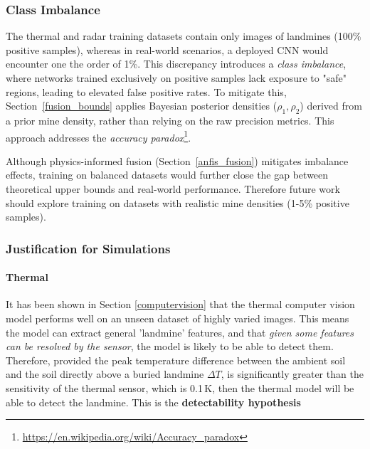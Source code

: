     \subsubsection{Class Imbalance} \label{class_imbalance}

        \noindent The thermal and radar training datasets contain only images of landmines (100\% positive samples), whereas in real-world scenarios, a deployed CNN would encounter one the order of 1\%. This discrepancy introduces a \textit{class imbalance}, where networks trained exclusively on positive samples lack exposure to "safe" regions, leading to elevated false positive rates. To mitigate this, Section~\ref{fusion_bounds} applies Bayesian posterior densities (\(\rho_1, \rho_2\)) derived from a prior mine density, rather than relying on the raw precision metrics. This approach addresses the \textit{accuracy paradox}\footnote{\url{https://en.wikipedia.org/wiki/Accuracy_paradox}}.

        \noindent Although physics-informed fusion (Section~\ref{anfis_fusion}) mitigates imbalance effects, training on balanced datasets would further close the gap between theoretical upper bounds and real-world performance. Therefore future work should explore training on datasets with realistic mine densities (1-5\% positive samples).

        
    \subsubsection{Justification for Simulations} \label{simulation_justification}
    
    
        \paragraph{Thermal} 
        
            
           It has been shown in Section \ref{computervision} that the thermal computer vision model performs well on an unseen dataset of highly varied images. This means the model can extract general 'landmine' features, and that \textit{given some features can be resolved by the sensor}, the model is likely to be able to detect them. Therefore, provided the peak temperature difference between the ambient soil and the soil directly above a buried landmine \(\Delta T\), is significantly greater than the sensitivity of the thermal sensor, which is 0.1\,K, then the thermal model will be able to detect the landmine. This is the \textbf{detectability hypothesis}

